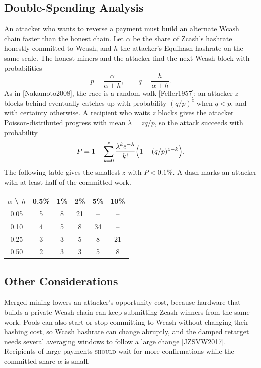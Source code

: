 \documentclass[10pt,letterpaper]{article}
\newcommand\SHOULD{\textsc{should}}
\theoremstyle{plain}
\begin{document}
\subsection{Double-Spending Analysis}\label{sec:doublespend}

An attacker who wants to reverse a payment must build an alternate Wcash chain faster than the honest chain. Let $\alpha$ be the share of Zcash's hashrate honestly committed to Wcash, and $h$ the attacker's Equihash hashrate on the same scale. The honest miners and the attacker find the next Wcash block with probabilities
\[
p = \frac{\alpha}{\alpha + h}, \qquad q = \frac{h}{\alpha + h}.
\]
As in [Nakamoto2008], the race is a random walk [Feller1957]: an attacker $z$ blocks behind eventually catches up with probability $(q/p)^z$ when $q < p$, and with certainty otherwise. A recipient who waits $z$ blocks gives the attacker Poisson-distributed progress with mean $\lambda = zq/p$, so the attack succeeds with probability
\[
P = 1 - \sum_{k=0}^{z} \frac{\lambda^k e^{-\lambda}}{k!}\Bigl(1 - (q/p)^{z-k}\Bigr).
\]
The following table gives the smallest $z$ with $P < 0.1\%$. A dash marks an attacker with at least half of the committed work.

\begin{center}\small
\begin{tabular}{|c|c|c|c|c|c|}
\hline
$\alpha$ \textbackslash{} $h$ & 0.5\% & 1\% & 2\% & 5\% & 10\%\\
\hline
0.05 & 5 & 8 & 21 & -- & --\\
0.10 & 4 & 5 & 8 & 34 & --\\
0.25 & 3 & 3 & 5 & 8 & 21\\
0.50 & 2 & 3 & 3 & 5 & 8\\
\hline
\end{tabular}
\end{center}

\subsection{Other Considerations}\label{sec:other}

Merged mining lowers an attacker's opportunity cost, because hardware that builds a private Wcash chain can keep submitting Zcash winners from the same work. Pools can also start or stop committing to Wcash without changing their hashing cost, so Wcash hashrate can change abruptly, and the damped retarget needs several averaging windows to follow a large change [JZSVW2017]. Recipients of large payments \SHOULD{} wait for more confirmations while the committed share $\alpha$ is small.
\end{document}

